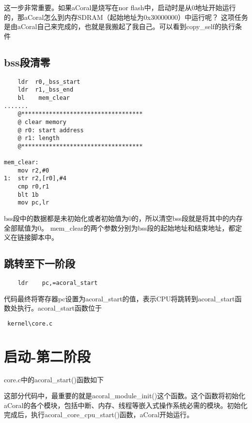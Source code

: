 这一步非常重要。如果aCoral是烧写在nor flash中，启动时是从0地址开始运行的，那aCoral怎么到内存SDRAM（起始地址为0x30000000）中运行呢？
这项任务是由aCoral自己来完成的，也就是我搬起了我自己。可以看到copy\_self的执行条件

\subsection{bss段清零}
\begin{lstlisting}
	ldr  r0,_bss_start
	ldr  r1,_bss_end
	bl    mem_clear
.......
	@***********************************
	@ clear memory
	@ r0: start address
	@ r1: length
	@***********************************

mem_clear:
	mov r2,#0
1:	str r2,[r0],#4
	cmp r0,r1
	blt 1b
	mov pc,lr
\end{lstlisting}

bss段中的数据都是未初始化或者初始值为0的，所以清空bss段就是将其中的内存全部赋值为0。
mem\_clear的两个参数分别为bss段的起始地址和结束地址，都定义在链接脚本中。

\subsection{跳转至下一阶段}
\begin{lstlisting}
	ldr    pc,=acoral_start	
\end{lstlisting}

代码最终将寄存器pc设置为acoral\_start的值，表示CPU将跳转到acoral\_start函数处执行。acoral\_start函数位于
\begin{lstlisting}
 kernel\core.c
\end{lstlisting}
\section{启动-第二阶段}

core.c中的acoral\_start()函数如下

这部分代码中，最重要的就是acoral\_module\_init()这个函数。这个函数将初始化aCoral的各个模块，包括中断、内存、线程等嵌入式操作系统必需的模块。初始化完成后，执行acoral\_core\_cpu\_start()函数，aCoral开始运行。

